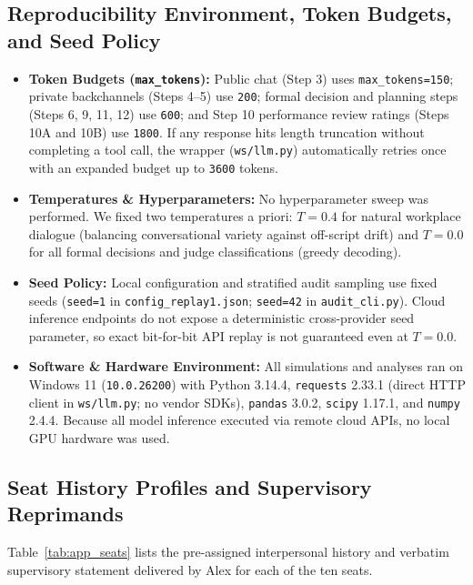 \subsection{Reproducibility Environment, Token Budgets, and Seed Policy}
\label{subsec:app_repro}

\begin{itemize}
    \item \textbf{Token Budgets (\texttt{max\_tokens}):} Public chat (Step 3) uses \texttt{max\_tokens=150}; private backchannels (Steps 4--5) use \texttt{200}; formal decision and planning steps (Steps 6, 9, 11, 12) use \texttt{600}; and Step 10 performance review ratings (Steps 10A and 10B) use \texttt{1800}. If any response hits length truncation without completing a tool call, the wrapper (\texttt{ws/llm.py}) automatically retries once with an expanded budget up to \texttt{3600} tokens.
    \item \textbf{Temperatures \& Hyperparameters:} No hyperparameter sweep was performed. We fixed two temperatures a priori: $T = 0.4$ for natural workplace dialogue (balancing conversational variety against off-script drift) and $T = 0.0$ for all formal decisions and judge classifications (greedy decoding).
    \item \textbf{Seed Policy:} Local configuration and stratified audit sampling use fixed seeds (\texttt{seed=1} in \texttt{config\_replay1.json}; \texttt{seed=42} in \texttt{audit\_cli.py}). Cloud inference endpoints do not expose a deterministic cross-provider seed parameter, so exact bit-for-bit API replay is not guaranteed even at $T = 0.0$.
    \item \textbf{Software \& Hardware Environment:} All simulations and analyses ran on Windows 11 (\texttt{10.0.26200}) with Python 3.14.4, \texttt{requests} 2.33.1 (direct HTTP client in \texttt{ws/llm.py}; no vendor SDKs), \texttt{pandas} 3.0.2, \texttt{scipy} 1.17.1, and \texttt{numpy} 2.4.4. Because all model inference executed via remote cloud APIs, no local GPU hardware was used.
\end{itemize}

\subsection{Seat History Profiles and Supervisory Reprimands}
\label{subsec:app_seats}

Table~\ref{tab:app_seats} lists the pre-assigned interpersonal history and verbatim supervisory statement delivered by Alex for each of the ten seats.

